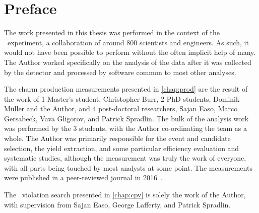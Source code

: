 \chapter{Preface}


The work presented in this thesis was performed in the context of the \lhcb\ 
experiment, a collaboration of around 800 scientists and engineers.
As such, it would not have been possible to perform without the often implicit 
help of many.
The Author worked specifically on the analysis of the data after it was 
collected by the detector and processed by software common to most other 
analyses.

The charm production measurements presented in \cref{chap:prod} are the result 
of the work of 1 Master's student, Christopher Burr, 2 PhD students, Dominik 
M\"{u}ller and the Author, and 4 post-doctoral researchers, Sajan Easo, Marco 
Gersabeck, Vava Gligorov, and Patrick Spradlin.
The bulk of the analysis work was performed by the 3 students, with the Author 
co-ordinating the team as a whole.
The Author was primarily responsible for the event and candidate selection, the 
yield extraction, and some particular efficiency evaluation and systematic 
studies, although the measurement was truly the work of everyone, with all 
parts being touched by most analysts at some point.
The measurements were published in a peer-reviewed journal in 
2016~\cite{Aaij:2015bpa}.

The \CP\ violation search presented in \cref{chap:cpv} is solely the work of 
the Author, with supervision from Sajan Easo, George Lafferty, and Patrick 
Spradlin.
